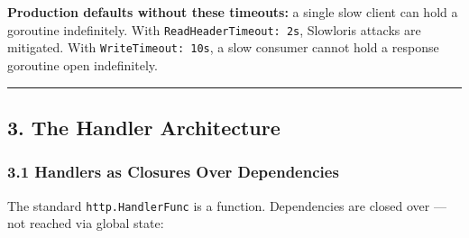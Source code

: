 \documentclass[
]{article}
\begin{document}
\textbf{Production defaults without these timeouts:} a single slow
client can hold a goroutine indefinitely. With
\texttt{ReadHeaderTimeout:\ 2s}, Slowloris attacks are mitigated. With
\texttt{WriteTimeout:\ 10s}, a slow consumer cannot hold a response
goroutine open indefinitely.

\begin{center}\rule{0.5\linewidth}{0.5pt}\end{center}

\hypertarget{the-handler-architecture}{%
\subsection{3. The Handler
Architecture}\label{the-handler-architecture}}

\hypertarget{handlers-as-closures-over-dependencies}{%
\subsubsection{3.1 Handlers as Closures Over
Dependencies}\label{handlers-as-closures-over-dependencies}}

The standard \texttt{http.HandlerFunc} is a function. Dependencies are
closed over --- not reached via global state:
\end{document}
